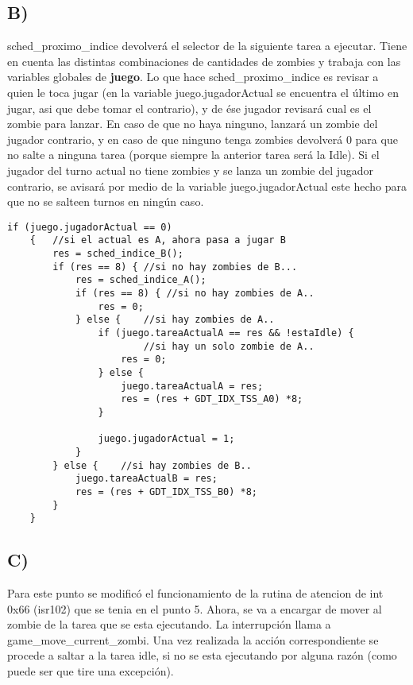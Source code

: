 \subsection*{B)}
sched\_proximo\_indice devolver\'a el selector de la siguiente tarea a ejecutar. Tiene en cuenta las distintas combinaciones de cantidades de zombies 
y trabaja con las variables globales de \textbf{juego}.
Lo que hace sched\_proximo\_indice es revisar a quien le toca jugar (en la variable juego.jugadorActual se encuentra el \'ultimo en jugar, asi que 
debe tomar el contrario), y de \'ese jugador revisar\'a cual es el zombie para lanzar. En caso de que no haya ninguno, lanzar\'a un zombie del jugador 
contrario, y en caso de que ninguno tenga zombies devolver\'a $0$ para que no salte a ninguna tarea (porque siempre la anterior tarea ser\'a la Idle).
Si el jugador del turno actual no tiene zombies y se lanza un zombie del jugador contrario, se avisar\'a por medio de la variable juego.jugadorActual 
este hecho para que no se salteen turnos en ning\'un caso.
\begin{codesnippet}
\begin{verbatim}
if (juego.jugadorActual == 0) 
	{	//si el actual es A, ahora pasa a jugar B 
		res = sched_indice_B();
		if (res == 8) {	//si no hay zombies de B...
			res = sched_indice_A();
			if (res == 8) { //si no hay zombies de A..
				res = 0;
			} else {	//si hay zombies de A..
				if (juego.tareaActualA == res && !estaIdle) {
						//si hay un solo zombie de A..
					res = 0;
				} else {	
					juego.tareaActualA = res;
					res = (res + GDT_IDX_TSS_A0) *8;
				}
				
				juego.jugadorActual = 1;
			}
		} else {	//si hay zombies de B..
			juego.tareaActualB = res;
			res = (res + GDT_IDX_TSS_B0) *8;
		}
	}
\end{verbatim}
\end{codesnippet}

\subsection*{C)}
Para este punto se modific\'o el funcionamiento de la rutina de atencion de int 0x66 (isr102) que se tenia en el punto 5. Ahora, se va a encargar de 
mover al zombie de la tarea 
que se esta ejecutando. La interrupci\'on llama a game\_move\_current\_zombi. Una vez realizada la acci\'on correspondiente se procede a saltar a la 
tarea idle, si no se esta ejecutando por alguna raz\'on (como puede ser que tire una excepci\'on).

